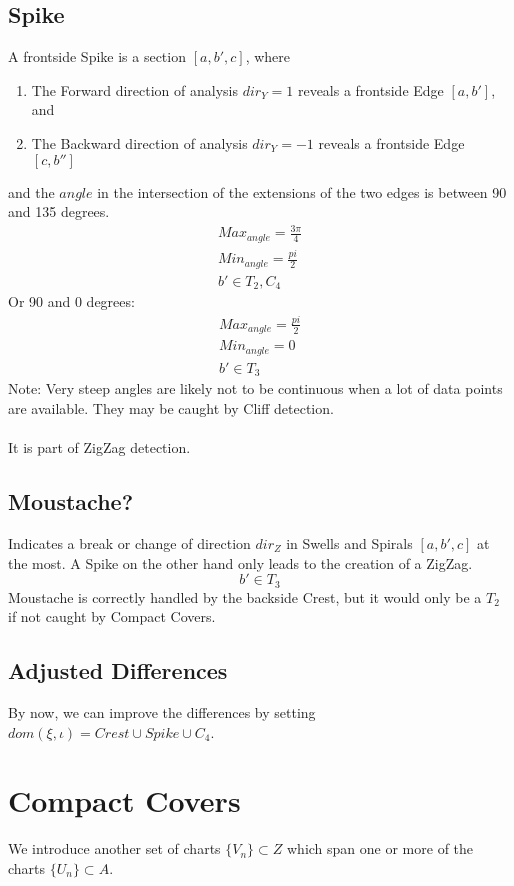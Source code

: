 \documentclass{report}
\begin{document}
\subsection{Spike}
A frontside Spike is a section $[a,b',c]$, where
\begin{enumerate}
\item The Forward direction of analysis $dir_{Y}=1$ reveals a frontside Edge $[a,b']$, and
\item The Backward direction of analysis $dir_{Y}=-1$ reveals a frontside Edge $[c,b'']$ 
\end{enumerate}
and the $angle$ in the intersection of the extensions of the two edges is between 90 and 135 degrees.\\
\begin{align}
Max_{angle}=\frac{3\pi}{4}\\
Min_{angle}=\frac{pi}{2}\\
b' \in T_{2},C_{4}
\end{align}
Or 90 and 0 degrees:
\begin{align}
Max_{angle}=\frac{pi}{2}\\
Min_{angle}=0\\
b' \in T_{3}
\end{align}
Note: Very steep angles are likely not to be continuous when a lot of data points are available. They may be caught by Cliff detection.\\\\
It is part of ZigZag detection.

\subsection{Moustache?}
Indicates a break or change of direction $dir_{Z}$ in Swells and Spirals $[a,b',c]$ at the most. A Spike on the other hand only leads to the creation of a ZigZag.
\begin{equation}
b' \in T_{3}
\end{equation}
Moustache is correctly handled by the backside Crest, but it would only be a $T_{2}$ if not caught by Compact Covers.

\subsection*{Adjusted Differences}
By now, we can improve the differences by setting $dom(\xi,\iota)=Crest \cup Spike \cup C_{4}$.

\section{Compact Covers}
We introduce another set of charts $\{V_{n}\} \subset Z$ which span one or more of the charts $\{U_{n}\} \subset A$.
\end{document}
